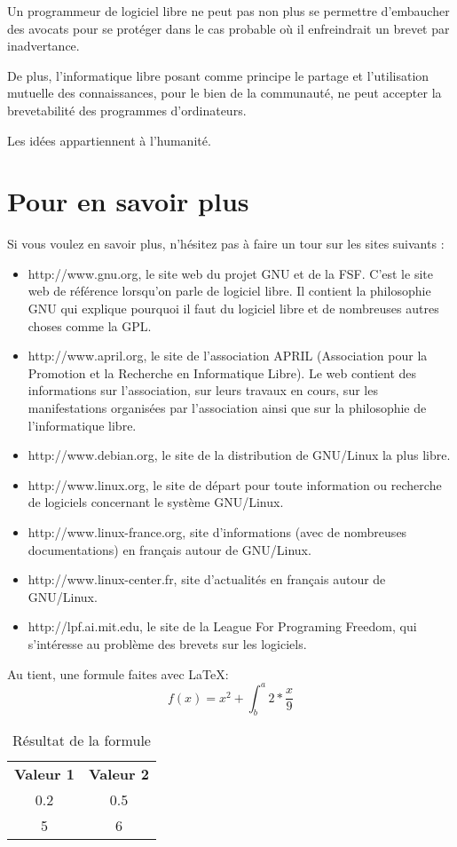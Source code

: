 \documentclass{article}
\begin{document}
Un programmeur de logiciel libre ne peut pas non plus se permettre d'embaucher des avocats pour se protéger dans le cas probable où il enfreindrait un brevet par inadvertance.

De plus, l'informatique libre posant comme principe le partage et l'utilisation mutuelle des connaissances, pour le bien de la communauté, ne peut accepter la brevetabilité des programmes d'ordinateurs.

Les idées appartiennent à l'humanité.
\section{Pour en savoir plus}

Si vous voulez en savoir plus, n'hésitez pas à faire un tour sur les sites suivants :
\begin{itemize}
    \item http://www.gnu.org, le site web du projet GNU et de la FSF. C'est le site web de référence lorsqu'on parle de logiciel libre. Il contient la philosophie GNU qui explique pourquoi il faut du logiciel libre et de nombreuses autres choses comme la GPL.
    \item http://www.april.org, le site de l'association APRIL (Association pour la Promotion et la Recherche en Informatique Libre). Le web contient des informations sur l'association, sur leurs travaux en cours, sur les manifestations organisées par l'association ainsi que sur la philosophie de l'informatique libre.
    \item http://www.debian.org, le site de la distribution de GNU/Linux la plus libre.
    \item http://www.linux.org, le site de départ pour toute information ou recherche de logiciels concernant le système GNU/Linux.
    \item http://www.linux-france.org, site d'informations (avec de nombreuses documentations) en français autour de GNU/Linux.
    \item http://www.linux-center.fr, site d'actualités en français autour de GNU/Linux.
    \item http://lpf.ai.mit.edu, le site de la League For Programing Freedom, qui s'intéresse au problème des brevets sur les logiciels.
\end{itemize}
    Au tient, une formule faites avec \LaTeX :
\begin{equation}
    f(x) = x^2 + \int^a_b{2 * \frac{x}{9}}
\end{equation}
\begin{table}[h!]
    \centering
    \begin{tabular}{c|c}
        \textbf{Valeur 1} & \textbf{Valeur 2} \\
        0.2 & 0.5 \\
        5 & 6
    \end{tabular}
    \caption{Résultat de la formule}
\end{table}
\end{document}
